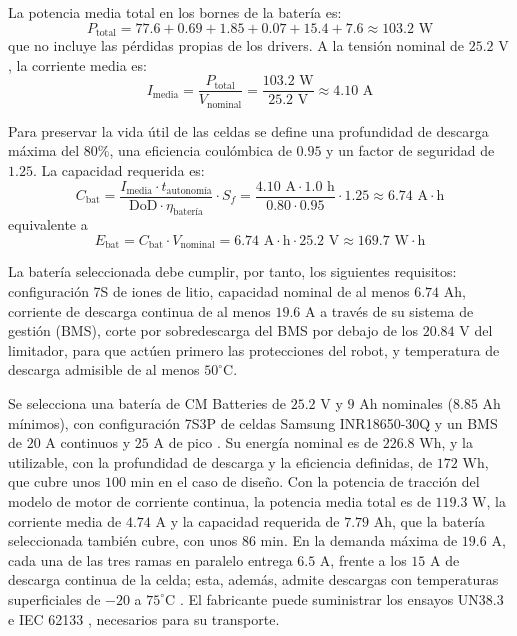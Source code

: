 \documentclass[../../General.tex]{subfiles}
\begin{document}
La potencia media total en los bornes de la batería es:
\begin{equation}
P_{\text{total}} = 77.6 + 0.69 + 1.85 + 0.07 + 15.4 + 7.6 \approx 103.2\text{ W}
\end{equation}
que no incluye las pérdidas propias de los drivers. A la tensión nominal de $25.2\text{ V}$, la corriente media es:
\begin{equation}
I_{\text{media}} = \frac{P_{\text{total}}}{V_{\text{nominal}}} = \frac{103.2\text{ W}}{25.2\text{ V}} \approx 4.10\text{ A}
\end{equation}

Para preservar la vida útil de las celdas se define una profundidad de descarga máxima del $80\%$, una eficiencia coulómbica de $0.95$ y un factor de seguridad de $1.25$. La capacidad requerida es:
\begin{equation}
C_{\text{bat}} = \frac{I_{\text{media}} \cdot t_{\text{autonomía}}}{\text{DoD} \cdot \eta_{\text{batería}}} \cdot S_f = \frac{4.10\text{ A} \cdot 1.0\text{ h}}{0.80 \cdot 0.95} \cdot 1.25 \approx 6.74\text{ A}\cdot\text{h}
\end{equation}
equivalente a
\begin{equation}
E_{\text{bat}} = C_{\text{bat}} \cdot V_{\text{nominal}} = 6.74\text{ A}\cdot\text{h} \cdot 25.2\text{ V} \approx 169.7\text{ W}\cdot\text{h}
\end{equation}

La batería seleccionada debe cumplir, por tanto, los siguientes requisitos: configuración 7S de iones de litio, capacidad nominal de al menos $6.74\text{ Ah}$, corriente de descarga continua de al menos $19.6\text{ A}$ a través de su sistema de gestión (BMS), corte por sobredescarga del BMS por debajo de los $20.84\text{ V}$ del limitador, para que actúen primero las protecciones del robot, y temperatura de descarga admisible de al menos $50^\circ\text{C}$. 

Se selecciona una batería de CM Batteries de $25.2\text{ V}$ y $9\text{ Ah}$ nominales ($8.85\text{ Ah}$ mínimos), con configuración 7S3P de celdas Samsung INR18650-30Q y un BMS de $20\text{ A}$ continuos y $25\text{ A}$ de pico \citep{cmbatteries_7s3p}. Su energía nominal es de $226.8\text{ Wh}$, y la utilizable, con la profundidad de descarga y la eficiencia definidas, de $172\text{ Wh}$, que cubre unos $100\text{ min}$ en el caso de diseño. Con la potencia de tracción del modelo de motor de corriente continua, la potencia media total es de $119.3\text{ W}$, la corriente media de $4.74\text{ A}$ y la capacidad requerida de $7.79\text{ Ah}$, que la batería seleccionada también cubre, con unos $86\text{ min}$. En la demanda máxima de $19.6\text{ A}$, cada una de las tres ramas en paralelo entrega $6.5\text{ A}$, frente a los $15\text{ A}$ de descarga continua de la celda; esta, además, admite descargas con temperaturas superficiales de $-20$ a $75^\circ\text{C}$ \citep{samsung_30q}. El fabricante puede suministrar los ensayos UN38.3 e IEC 62133 \citep{cmbatteries_7s3p}, necesarios para su transporte.
\end{document}
